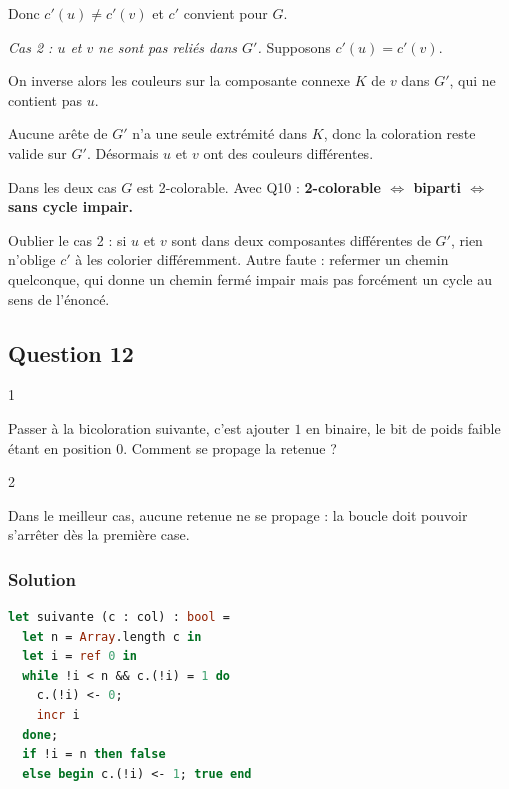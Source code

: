 \documentclass[11pt,a4paper]{article}
\begin{document}
Donc \(c'(u) \neq c'(v)\) et \(c'\) convient pour \(G\).

\emph{Cas 2 : \(u\) et \(v\) ne sont pas reliés dans \(G'\).} Supposons \(c'(u) = c'(v)\).

On inverse alors les couleurs sur la composante connexe \(K\) de \(v\) dans \(G'\), qui ne contient pas \(u\).

Aucune arête de \(G'\) n'a une seule extrémité dans \(K\), donc la coloration reste valide sur \(G'\). Désormais \(u\) et \(v\) ont des couleurs différentes.

Dans les deux cas \(G\) est 2-colorable. Avec Q10 : \textbf{2-colorable \(\iff\) biparti \(\iff\) sans cycle impair.}

\begin{piege}

Oublier le cas 2 : si \(u\) et \(v\) sont dans deux composantes différentes de \(G'\), rien n'oblige \(c'\) à les colorier différemment. Autre faute : refermer un chemin quelconque, qui donne un chemin fermé impair mais pas forcément un cycle au sens de l'énoncé.

\end{piege}

\hypertarget{question-12}{%
\subsection{Question 12}\label{question-12}}

\begin{indication}{1}

Passer à la bicoloration suivante, c'est ajouter \(1\) en binaire, le bit de poids faible étant en position \(0\). Comment se propage la retenue ?

\end{indication}

\begin{indication}{2}

Dans le meilleur cas, aucune retenue ne se propage : la boucle doit pouvoir s'arrêter dès la première case.

\end{indication}

\hypertarget{solution-11}{%
\subsubsection{Solution}\label{solution-11}}

\begin{lstlisting}[language=Caml]
let suivante (c : col) : bool =
  let n = Array.length c in
  let i = ref 0 in
  while !i < n && c.(!i) = 1 do
    c.(!i) <- 0;
    incr i
  done;
  if !i = n then false
  else begin c.(!i) <- 1; true end
\end{lstlisting}
\end{document}
